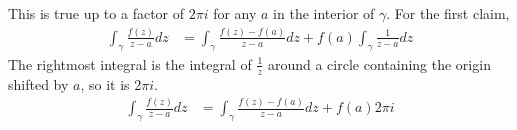 \documentclass{homework}
\begin{document}
                                                                                                                                                                                                                       \begin{solution}
                                                                                                                                                                                                                       This is true up to a factor of $2\pi i$ for any $a$ in the interior of $\gamma$. For the first claim,
                                                                                                                                                                                                                       \begin{align*}
                                                                                                                                                                                                                       \int_\gamma \frac{f(z)}{z-a}dz &= \int_\gamma \frac{f(z) - f(a)}{z-a}dz + f(a)\int_\gamma \frac{1}{z-a}dz
                                                                                                                                                                                                                       \end{align*}
                                                                                                                                                                                                                       The rightmost integral is the integral of $\frac{1}{z}$ around a circle containing the origin shifted by $a$, so it is $2\pi i$.
                                                                                                                                                                                                                       \begin{align}
                                                                                                                                                                                                                       \label{cauchys-integral-formula-really}
                                                                                                                                                                                                                       \int_\gamma \frac{f(z)}{z-a}dz &= \int_\gamma \frac{f(z) - f(a)}{z-a}dz + f(a)2\pi i

\end{align}
\end{solution}
\end{document}
